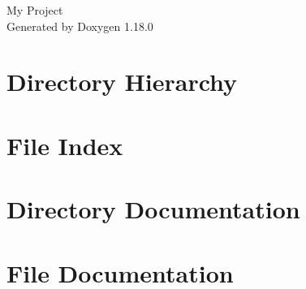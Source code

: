 \documentclass[twoside]{book}
\newcommand{\+}{\discretionary{\mbox{\scriptsize$\hookleftarrow$}}{}{}}
\newcommand{\clearemptydoublepage}{%
    \newpage{\pagestyle{empty}\cleardoublepage}%
  }
\begin{document}
  \raggedbottom
    \hypersetup{pageanchor=false,
                bookmarksnumbered=true,
                pdfencoding=unicode
               }
  \begin{titlepage}
  \vspace*{7cm}
  \begin{center}%
  {\Large My Project}\\
  \vspace*{1cm}
  {\large Generated by Doxygen 1.18.0}\\
  \end{center}
  \end{titlepage}
  \clearemptydoublepage
  \tableofcontents
  \clearemptydoublepage
  \hypersetup{pageanchor=true}
\chapter{Directory Hierarchy}

\chapter{File Index}

\chapter{Directory Documentation}

\chapter{File Documentation}


  \backmatter
  \newpage
  \clearemptydoublepage
  \printindex
\end{document}
